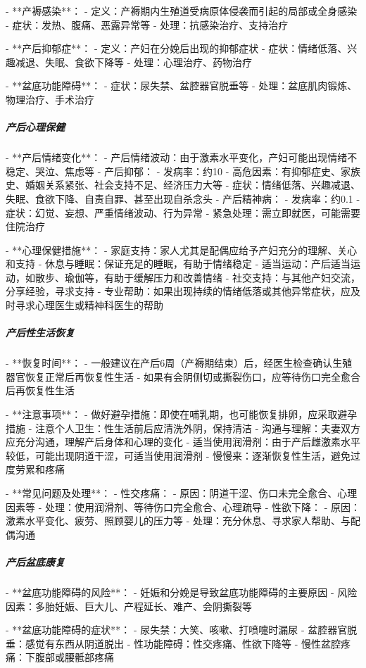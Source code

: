 \begin{enumerate}
- **产褥感染**：
  - 定义：产褥期内生殖道受病原体侵袭而引起的局部或全身感染
  - 症状：发热、腹痛、恶露异常等
  - 处理：抗感染治疗、支持治疗

- **产后抑郁症**：
  - 定义：产妇在分娩后出现的抑郁症状
  - 症状：情绪低落、兴趣减退、失眠、食欲下降等
  - 处理：心理治疗、药物治疗

- **盆底功能障碍**：
  - 症状：尿失禁、盆腔器官脱垂等
  - 处理：盆底肌肉锻炼、物理治疗、手术治疗

\subparagraph{产后心理保健}

- **产后情绪变化**：
  - 产后情绪波动：由于激素水平变化，产妇可能出现情绪不稳定、哭泣、焦虑等
  - 产后抑郁：
    - 发病率：约10%
    - 高危因素：有抑郁症史、家族史、婚姻关系紧张、社会支持不足、经济压力大等
    - 症状：情绪低落、兴趣减退、失眠、食欲下降、自责自罪、甚至出现自杀念头
  - 产后精神病：
    - 发病率：约0.1%
    - 症状：幻觉、妄想、严重情绪波动、行为异常
    - 紧急处理：需立即就医，可能需要住院治疗

- **心理保健措施**：
  - 家庭支持：家人尤其是配偶应给予产妇充分的理解、关心和支持
  - 休息与睡眠：保证充足的睡眠，有助于情绪稳定
  - 适当运动：产后适当运动，如散步、瑜伽等，有助于缓解压力和改善情绪
  - 社交支持：与其他产妇交流，分享经验，寻求支持
  - 专业帮助：如果出现持续的情绪低落或其他异常症状，应及时寻求心理医生或精神科医生的帮助

\subparagraph{产后性生活恢复}

- **恢复时间**：
  - 一般建议在产后6周（产褥期结束）后，经医生检查确认生殖器官恢复正常后再恢复性生活
  - 如果有会阴侧切或撕裂伤口，应等待伤口完全愈合后再恢复性生活

- **注意事项**：
  - 做好避孕措施：即使在哺乳期，也可能恢复排卵，应采取避孕措施
  - 注意个人卫生：性生活前后应清洗外阴，保持清洁
  - 沟通与理解：夫妻双方应充分沟通，理解产后身体和心理的变化
  - 适当使用润滑剂：由于产后雌激素水平较低，可能出现阴道干涩，可适当使用润滑剂
  - 慢慢来：逐渐恢复性生活，避免过度劳累和疼痛

- **常见问题及处理**：
  - 性交疼痛：
    - 原因：阴道干涩、伤口未完全愈合、心理因素等
    - 处理：使用润滑剂、等待伤口完全愈合、心理疏导
  - 性欲下降：
    - 原因：激素水平变化、疲劳、照顾婴儿的压力等
    - 处理：充分休息、寻求家人帮助、与配偶沟通

\subparagraph{产后盆底康复}

- **盆底功能障碍的风险**：
  - 妊娠和分娩是导致盆底功能障碍的主要原因
  - 风险因素：多胎妊娠、巨大儿、产程延长、难产、会阴撕裂等

- **盆底功能障碍的症状**：
  - 尿失禁：大笑、咳嗽、打喷嚏时漏尿
  - 盆腔器官脱垂：感觉有东西从阴道脱出
  - 性功能障碍：性交疼痛、性欲下降等
  - 慢性盆腔疼痛：下腹部或腰骶部疼痛


\end{enumerate}
